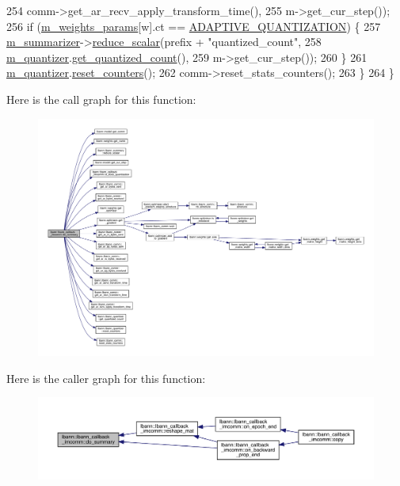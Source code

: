 \begin{DoxyCode}
254                                 comm->get\_ar\_recv\_apply\_transform\_time(),
255                                 m->get\_cur\_step());
256     \textcolor{keywordflow}{if} (\hyperlink{classlbann_1_1lbann__callback__imcomm_a32a0319c91aff324cb3468de4f31dd50}{m\_weights\_params}[w].ct == \hyperlink{classlbann_1_1lbann__callback__imcomm_acf7e894b3381e7f9b71020dc73594d6aaeb95973ab89fc579b91554cd783031b7}{ADAPTIVE\_QUANTIZATION}) \{
257       \hyperlink{classlbann_1_1lbann__callback_a277d46138184f85f161a8263b8322c76}{m\_summarizer}->\hyperlink{classlbann_1_1lbann__summary_a3e0b9aae1f80403a195567fd25ea2525}{reduce\_scalar}(prefix + \textcolor{stringliteral}{"quantized\_count"},
258                                   \hyperlink{classlbann_1_1lbann__callback__imcomm_a4994863d7f69e801c042c5d460bb3f34}{m\_quantizer}.\hyperlink{classlbann_1_1lbann__quantizer_afe560823e51a64b1bb42c6f6cbd83ee0}{get\_quantized\_count}(),
259                                   m->get\_cur\_step());
260     \}
261     \hyperlink{classlbann_1_1lbann__callback__imcomm_a4994863d7f69e801c042c5d460bb3f34}{m\_quantizer}.\hyperlink{classlbann_1_1lbann__quantizer_aee1ea46e3191ad25fd310938eaf5a2e0}{reset\_counters}();
262     comm->reset\_stats\_counters();
263   \}
264 \}
\end{DoxyCode}
Here is the call graph for this function\+:\nopagebreak
\begin{figure}[H]
\begin{center}
\leavevmode
\includegraphics[width=350pt]{classlbann_1_1lbann__callback__imcomm_ad45c39a7a85fb8e1d99eca97aa4d9d09_cgraph}
\end{center}
\end{figure}
Here is the caller graph for this function\+:\nopagebreak
\begin{figure}[H]
\begin{center}
\leavevmode
\includegraphics[width=350pt]{classlbann_1_1lbann__callback__imcomm_ad45c39a7a85fb8e1d99eca97aa4d9d09_icgraph}
\end{center}
\end{figure}
